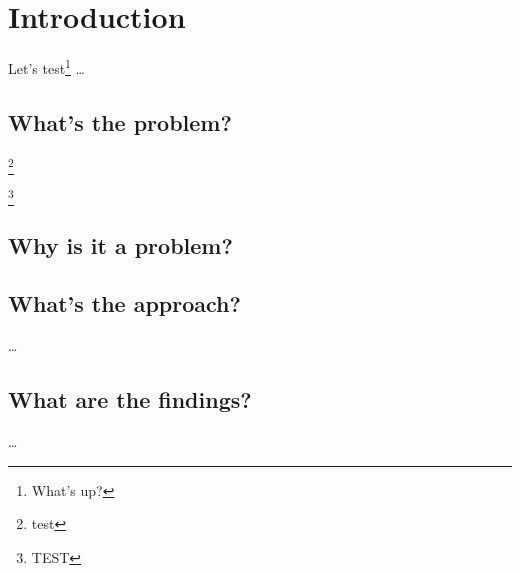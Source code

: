 \mode*

\chapter{Introduction}

Let's test\footnote{What's up?}
\dots

\lipsum

\section{What's the problem?}

\begin{adjustwidth}{-2em}{-10em}
\begin{multicols}{2}
  \lipsum[2]\footnote{test}

\columnbreak

\lipsum[2]\footnote{TEST}
\end{multicols}
\end{adjustwidth}


\section{Why is it a problem?}


\section{What's the approach?}

\dots


\section{What are the findings?}

\dots



